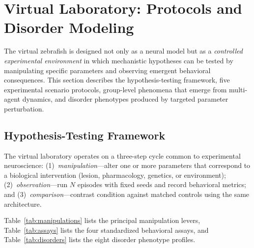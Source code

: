 \documentclass[12pt]{article}
\begin{document}
\section[Virtual Laboratory]{Virtual Laboratory: Protocols and Disorder Modeling}
\label{sec:virtual_lab}

The virtual zebrafish is designed not only as a neural model but as a
\emph{controlled experimental environment} in which mechanistic hypotheses
can be tested by manipulating specific parameters and observing emergent
behavioral consequences.
This section describes the hypothesis-testing framework, five experimental
scenario protocols, group-level phenomena that emerge from multi-agent
dynamics, and disorder phenotypes produced by targeted parameter
perturbation.

\subsection{Hypothesis-Testing Framework}

The virtual laboratory operates on a three-step cycle common to
experimental neuroscience:
(1)~\emph{manipulation}---alter one or more parameters that correspond to
a biological intervention (lesion, pharmacology, genetics, or environment);
(2)~\emph{observation}---run $N$ episodes with fixed seeds and record
behavioral metrics; and (3)~\emph{comparison}---contrast condition against
matched controls using the same architecture.

Table~\ref{tab:manipulations} lists the principal manipulation levers,
Table~\ref{tab:assays} lists the four standardized behavioral assays,
and Table~\ref{tab:disorders} lists the eight disorder phenotype profiles.
\end{document}
